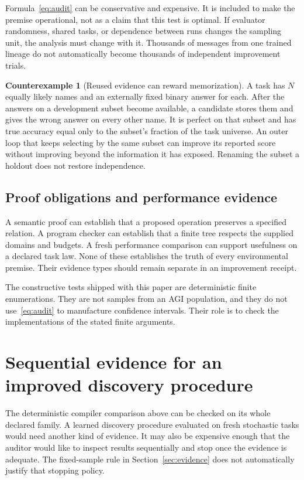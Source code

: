 \documentclass[11pt,letterpaper]{article}
\theoremstyle{plain}
\theoremstyle{definition}
\newtheorem{counterexample}[theorem]{Counterexample}
\begin{document}
Formula~\eqref{eq:audit} can be conservative and expensive. It is included to make the premise operational, not as a claim that this test is optimal. If evaluator randomness, shared tasks, or dependence between runs changes the sampling unit, the analysis must change with it. Thousands of messages from one trained lineage do not automatically become thousands of independent improvement trials.

\begin{counterexample}[Reused evidence can reward memorization]\label{ex:reuse}
A task has $N$ equally likely names and an externally fixed binary answer for each. After the answers on a development subset become available, a candidate stores them and gives the wrong answer on every other name. It is perfect on that subset and has true accuracy equal only to the subset's fraction of the task universe. An outer loop that keeps selecting by the same subset can improve its reported score without improving beyond the information it has exposed. Renaming the subset a holdout does not restore independence.
\end{counterexample}

\subsection{Proof obligations and performance evidence}
A semantic proof can establish that a proposed operation preserves a specified relation. A program checker can establish that a finite tree respects the supplied domains and budgets. A fresh performance comparison can support usefulness on a declared task law. None of these establishes the truth of every environmental premise. Their evidence types should remain separate in an improvement receipt.

The constructive tests shipped with this paper are deterministic finite enumerations. They are not samples from an AGI population, and they do not use~\eqref{eq:audit} to manufacture confidence intervals. Their role is to check the implementations of the stated finite arguments.

\section{Sequential evidence for an improved discovery procedure}\label{sec:anytime}
The deterministic compiler comparison above can be checked on its whole declared family. A learned discovery procedure evaluated on fresh stochastic tasks would need another kind of evidence. It may also be expensive enough that the auditor would like to inspect results sequentially and stop once the evidence is adequate. The fixed-sample rule in Section~\ref{sec:evidence} does not automatically justify that stopping policy.
\end{document}
